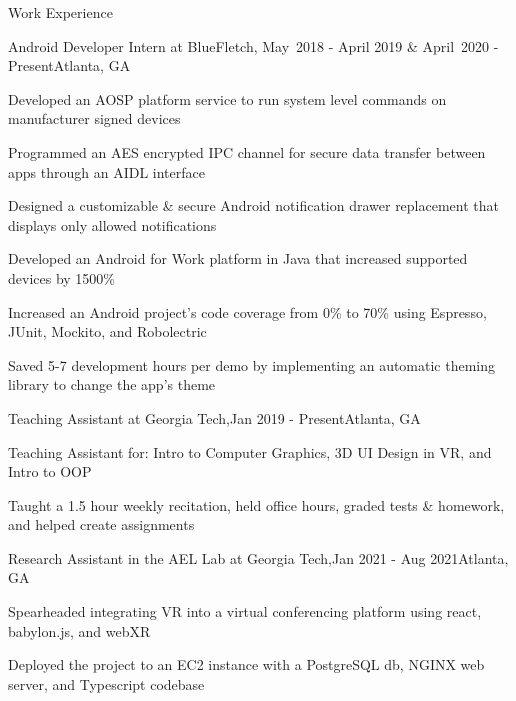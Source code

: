\documentclass{resume} %
\begin{document}
\begin{rSection}{Work Experience}
	
	\begin{rSubsection}{Android Developer Intern at BlueFletch,}{ May~2018 - April 2019 \& April~2020 - Present}{}{}{Atlanta, GA}
		\item Developed an AOSP platform service to run system level commands on manufacturer signed devices
		\item Programmed an AES encrypted IPC channel for secure data transfer between apps through an AIDL interface
		\item Designed a customizable \& secure Android notification drawer replacement that displays only allowed notifications
		\item Developed an Android for Work platform in Java that increased supported devices by 1500\%
		\item Increased an Android project's code coverage from 0\% to 70\% using Espresso, JUnit, Mockito, and Robolectric
		\item Saved 5-7 development hours per demo by implementing an automatic theming library to change the app's theme
		
	\end{rSubsection} 
	
		\begin{rSubsection}{Teaching Assistant at Georgia Tech,}{Jan 2019 - Present}{}{}{Atlanta, GA}
		\item Teaching Assistant for: Intro to Computer Graphics, 3D UI Design in VR, and Intro to OOP
		\item Taught a 1.5 hour weekly recitation, held office hours, graded tests \& homework, and helped create assignments
	\end{rSubsection} 
	
	\begin{rSubsection}{Research Assistant in the AEL Lab at Georgia Tech,}{Jan 2021 - Aug 2021}{}{}{Atlanta, GA}
		\item Spearheaded integrating VR into a virtual conferencing platform using react, babylon.js, and webXR 
		\item Deployed the project to an EC2 instance with a PostgreSQL db, NGINX web server, and Typescript codebase
	\end{rSubsection} 

	

\end{rSection} 
\end{document}
